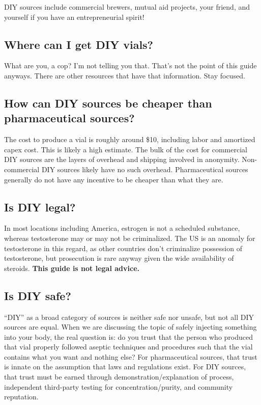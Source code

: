 \documentclass{article}
\begin{document}
DIY sources include commercial brewers, mutual aid projects, your friend, and yourself if you have an entrepreneurial spirit!

\subsection{Where can I get DIY vials?}

What are you, a cop? I’m not telling you that. That’s not the point of this guide anyways. There are other resources that have that information. Stay focused.

\subsection{How can DIY sources be cheaper than pharmaceutical sources?}

The cost to produce a vial is roughly around \$10, including labor and amortized capex cost. This is likely a high estimate. The bulk of the cost for commercial DIY sources are the layers of overhead and shipping involved in anonymity. Non-commercial DIY sources likely have no such overhead. Pharmaceutical sources generally do not have any incentive to be cheaper than what they are.

\subsection{Is DIY legal?}\label{6-11}

In most locations including America, estrogen is not a scheduled substance, whereas testosterone may or may not be criminalized. The US is an anomaly for testosterone in this regard, as other countries don’t criminalize possession of testosterone, but prosecution is rare anyway given the wide availability of steroids. \textbf{This guide is not legal advice.}

\subsection{Is DIY safe?}

“DIY” as a broad category of sources is neither safe nor unsafe, but not all DIY sources are equal. When we are discussing the topic of safely injecting something into your body, the real question is: do you trust that the person who produced that vial properly followed aseptic techniques and procedures such that the vial contains what you want and nothing else? For pharmaceutical sources, that trust is innate on the assumption that laws and regulations exist. For DIY sources, that trust must be earned through demonstration/explanation of process, independent third-party testing for concentration/purity, and community reputation.
\end{document}
